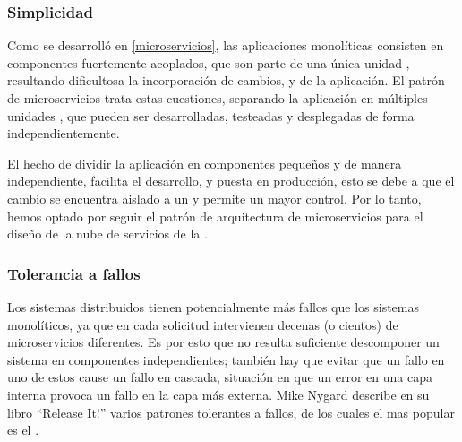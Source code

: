 \subsubsection{Simplicidad}

Como se desarrolló en \autoref{microservicios}, las aplicaciones monolíticas consisten en componentes fuertemente acoplados, que son parte de una única unidad , resultando dificultosa la incorporación de cambios,  y  de la aplicación.  El patrón de microservicios trata estas cuestiones, separando la aplicación en múltiples unidades , que pueden ser desarrolladas, testeadas y desplegadas de forma independientemente.

El hecho de dividir la aplicación en componentes pequeños y  de manera independiente, facilita el desarrollo,  y puesta en producción, esto se debe a que el cambio se encuentra aislado a un  y permite un mayor control.  Por lo tanto, hemos optado por seguir el patrón de arquitectura de microservicios para el diseño de la nube de servicios de la {\unlp}.

\subsubsection{Tolerancia a fallos}

Los sistemas distribuidos tienen potencialmente más fallos que los sistemas monolíticos, ya que en cada solicitud intervienen decenas (o cientos) de microservicios diferentes\cite[p.~48]{stin2015}. Es por esto que no resulta suficiente descomponer un sistema en componentes independientes; también hay que evitar que un fallo en uno de estos cause un fallo en cascada\cite[p.~4]{stin2015}, situación en que un error en una capa interna provoca un fallo en la capa más externa\cite[p.~65]{nygard2007}. Mike Nygard describe en su libro ``Release It!''\cite{nygard2007} varios patrones tolerantes a fallos, de los cuales el mas popular es el .

